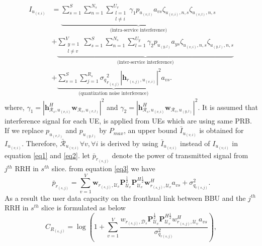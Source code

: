 \documentclass[conference]{IEEEtran}
\begin{document}
\begin{equation}
\begin{split}
 I_{u_{(v,i)}} &= 
 \underbrace{\sum_{s=1}^{S}\sum_{n=1}^{N_s}\sum_{\substack{l=1 \\ l\neq i}}^{{U}_v} \gamma_{1}  p_{u_{(v,l)}}a_{vs}\zeta_{u_(v,i),n,s}\zeta_{u_(v,l),n,s}}_{\text{(intra-service interference)}}\\
&+ \underbrace{\sum_{\substack{y=1 \\ l\neq v}}^{V}\sum_{s=1}^{S}\sum_{n=1}^{N_s}\sum_{l=1}^{{U}_y} \gamma_{2}  p_{u_{(y,l)}}a_{ys} \zeta_{u_(v,i),n,s}\zeta_{u_(y,l),n,s}}_{\text{(inter-service interference)}}\\
&+\underbrace{ \sum_{s=1}^{S} \sum_{j=1}^{{R}_s} {\sigma_q}_{r_{(s,j)}}^2 |\boldsymbol{h}_{r_{(s,j)}, u_{(v,i)}}|^2 a_{vs}}_{\text{(quantization noise interference)}}.
\end{split}
\end{equation}
where, $\gamma_{1} =|\boldsymbol{h}_{\mathcal{R}_s, u_{(v,i)}}^H \boldsymbol{w}_{\mathcal{R}_{s},u_{(v,l)}}|^2$
and $\gamma_{2} =|\boldsymbol{h}_{\mathcal{R}_s, u_{(v,i)}}^H \boldsymbol{w}_{\mathcal{R}_{s},u_{(y,l)}}|^2$.
It is assumed that interference signal for each UE, is applied from UEs which are using same PRB.
If we replace $p_{u_{(v,l)}}$ and $p_{u_{(y,l)}}$ by $P_{max}$, an upper bound $\bar{I}_{u_{(v,i)}}$ is obtained for $I_{u_{(v,i)}}$. Therefore, $\bar{\mathcal{R}}_{u_{(v,i)}} \forall v , \forall i$ is derived by using $\bar{I}_{u_{(v,i)}}$ instead of $I_{u_{(v,i)}}$ in equation \eqref{eq1} and \eqref{eq2}.\newline
let $\bar{p}_{r_{(s,j)}}$ denote the power of transmitted signal from $j^{th}$ RRH in $s^{th}$ slice.
from equation \eqref{eq3} we have
\begin{equation}
\bar{p}_{r_{(s,j)}} = \sum_{v=1}^{V}\boldsymbol{w}_{r_{(s,j)},\mathcal{U}_{v}} \boldsymbol{P}_{\mathcal{U}_v}^{\frac{1}{2}} \boldsymbol{P}_{\mathcal{U}_v}^{H \frac{1}{2}}   \boldsymbol{w}_{r_{(s,j)},\mathcal{U}_{v}}^H a_{vs} + \sigma_{q_{r(s,j)}}^2.
\end{equation}
As a result the user data capacity on the fronthual link between BBU and the $j^{th}$ RRH in $s^{th}$ slice is formulated as below
\begin{equation}
C_{R_{(s,j)}} = \log{(1+\sum_{v=1}^{V}\frac{w_{r_{(s,j)},\mathcal{D}_{s}} \boldsymbol{P}_{\mathcal{U}_v}^{\frac{1}{2}} \boldsymbol{P}_{\mathcal{U}_v}^{H \frac{1}{2}}   w_{r_{(s,j)},\mathcal{U}_{v}}^H a_{vs}}{ \sigma_{q_{r(s,j)}}^2})},
\end{equation}
\end{document}
